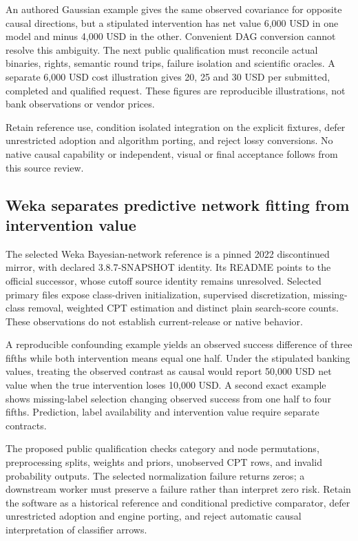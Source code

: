 An authored Gaussian example gives the same observed covariance for
opposite causal directions, but a stipulated intervention has net value
6,000 USD in one model and minus 4,000 USD in the other. Convenient DAG
conversion cannot resolve this ambiguity. The next public qualification
must reconcile actual binaries, rights, semantic round trips, failure
isolation and scientific oracles. A separate 6,000 USD cost illustration
gives 20, 25 and 30 USD per submitted, completed and qualified request.
These figures are reproducible illustrations, not bank observations or
vendor prices.\citep{exec24_pytetrad_choice}

Retain reference use, condition isolated integration on the explicit
fixtures, defer unrestricted adoption and algorithm porting, and reject
lossy conversions. No native causal capability or independent, visual or
final acceptance follows from this source
review.\citep{exec24_pytetrad_choice}

\hypertarget{weka-separates-predictive-network-fitting-from-intervention-value}{%
\subsection{Weka separates predictive network fitting from intervention
value}\label{weka-separates-predictive-network-fitting-from-intervention-value}}

The selected Weka Bayesian-network reference is a pinned 2022
discontinued mirror, with declared 3.8.7-SNAPSHOT identity. Its README
points to the official successor, whose cutoff source identity remains
unresolved. Selected primary files expose class-driven initialization,
supervised discretization, missing-class removal, weighted CPT
estimation and distinct plain search-score counts. These observations do
not establish current-release or native
behavior.\citep{exec24_weka_source}

A reproducible confounding example yields an observed success difference
of three fifths while both intervention means equal one half. Under the
stipulated banking values, treating the observed contrast as causal
would report 50,000 USD net value when the true intervention loses
10,000 USD. A second exact example shows missing-label selection
changing observed success from one half to four fifths. Prediction,
label availability and intervention value require separate
contracts.\citep{exec24_weka_choice}

The proposed public qualification checks category and node permutations,
preprocessing splits, weights and priors, unobserved CPT rows, and
invalid probability outputs. The selected normalization failure returns
zeros; a downstream worker must preserve a failure rather than interpret
zero risk. Retain the software as a historical reference and conditional
predictive comparator, defer unrestricted adoption and engine porting,
and reject automatic causal interpretation of classifier
arrows.\citep{exec24_weka_source,exec24_weka_choice}

